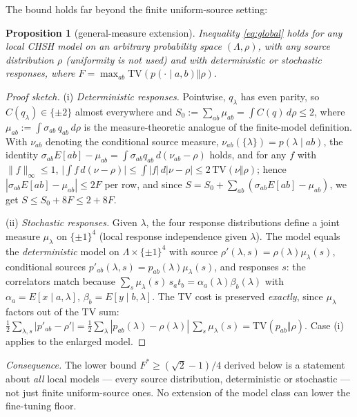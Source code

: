 \documentclass[aps,pra,reprint,superscriptaddress,floatfix]{revtex4-2}
\newcommand{\TV}{\mathrm{TV}}
\newtheorem{proposition}{Proposition}
\begin{document}
The bound holds far beyond the finite uniform-source setting:

\begin{proposition}[general-measure extension]
\label{prop:general}
Inequality \eqref{eq:global} holds for any local CHSH model on an arbitrary
probability space $(\Lambda,\rho)$, with \emph{any} source distribution
$\rho$ (uniformity is not used) and with deterministic or stochastic
responses, where $F=\max_{ab}\TV(p(\cdot\mid a,b)\Vert\rho)$.
\end{proposition}

\begin{proof}[Proof sketch]
(i) \emph{Deterministic responses.} Pointwise, $q_\lambda$ has even parity,
so $C(q_\lambda)\in\{\pm2\}$ almost everywhere and
$S_0:=\sum_{ab}\mu_{ab}=\int C(q)\,d\rho\le 2$, where
$\mu_{ab}:=\int\sigma_{ab}\,q_{ab}\,d\rho$ is the measure-theoretic analogue
of the finite-model definition. With $\nu_{ab}$ denoting the conditional
source measure, $\nu_{ab}(\{\lambda\})=p(\lambda\mid ab)$, the identity
$\sigma_{ab}E[ab]-\mu_{ab}=\int\sigma_{ab}q_{ab}\,d(\nu_{ab}-\rho)$ holds, and
for any $f$ with $\|f\|_\infty\le1$,
$\bigl|\int f\,d(\nu-\rho)\bigr|\le\int|f|\,d|\nu-\rho|\le 2\,\TV(\nu\Vert\rho)$;
hence $|\sigma_{ab}E[ab]-\mu_{ab}|\le 2F$ per row, and since
$S=S_0+\sum_{ab}(\sigma_{ab}E[ab]-\mu_{ab})$, we get $S\le S_0+8F\le 2+8F$.

(ii) \emph{Stochastic responses.} Given $\lambda$, the four response
distributions define a joint measure $\mu_\lambda$ on $\{\pm1\}^4$ (local
response independence given $\lambda$). The model equals the
\emph{deterministic} model on $\Lambda\times\{\pm1\}^4$ with source
$\rho'(\lambda,s)=\rho(\lambda)\mu_\lambda(s)$, conditional sources
$p'_{ab}(\lambda,s)=p_{ab}(\lambda)\mu_\lambda(s)$, and responses $s$: the
correlators match because
$\sum_s \mu_\lambda(s)\,s_a t_b=\alpha_a(\lambda)\beta_b(\lambda)$ with
$\alpha_a=E[x\mid a,\lambda]$, $\beta_b=E[y\mid b,\lambda]$. The TV cost is
preserved \emph{exactly}, since $\mu_\lambda$ factors out of the TV sum:
$\tfrac12\sum_{\lambda,s}|p'_{ab}-\rho'| = \tfrac12\sum_\lambda|p_{ab}(\lambda)-\rho(\lambda)|\,\sum_s\mu_\lambda(s)
= \TV(p_{ab}\Vert\rho)$. Case (i) applies to the enlarged model.
\end{proof}

\noindent
\emph{Consequence.} The lower bound $F^*\ge(\sqrt{2}-1)/4$ derived below is a
statement about \emph{all} local models --- every source distribution,
deterministic or stochastic --- not just finite uniform-source ones. No
extension of the model class can lower the fine-tuning floor.
\end{document}
